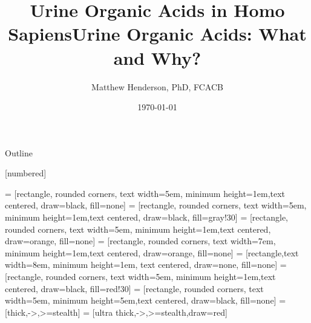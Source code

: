 \documentclass[presentation]{beamer}
\author{Matthew Henderson, PhD, FCACB}
\date{\today}
\title{Urine Organic Acids in Homo Sapiens}
\title{Urine Organic Acids: What and Why?}
\institute[NSO]{Newborn Screening Ontario}
\begin{document}
\maketitle
\begin{frame}{Outline}
\tableofcontents
\end{frame}



\vspace{220pt}
\beamertemplatenavigationsymbolsempty
{}[numbered]


 = [rectangle, rounded corners, text width=5em, minimum height=1em,text centered, draw=black, fill=none]
 = [rectangle, rounded corners, text width=5em, minimum height=1em,text centered, draw=black, fill=gray!30]
 = [rectangle, rounded corners, text width=5em, minimum height=1em,text centered, draw=orange, fill=none]
 = [rectangle, rounded corners, text width=7em, minimum height=1em,text centered, draw=orange, fill=none]
 = [rectangle,text width=8em, minimum height=1em, text centered, draw=none, fill=none]
 = [rectangle, rounded corners, text width=5em, minimum height=1em,text centered, draw=black, fill=red!30]
 = [rectangle, rounded corners, text width=5em, minimum height=5em,text centered, draw=black, fill=none]
 = [thick,->,>=stealth]
 = [ultra thick,->,>=stealth,draw=red]
\end{document}
